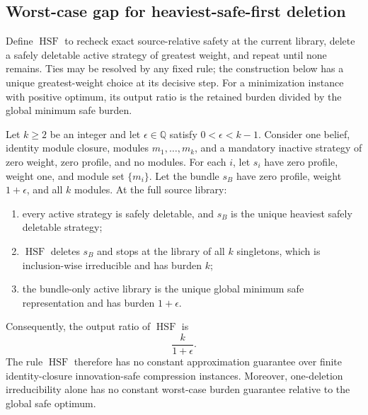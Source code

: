 \subsection{Worst-case gap for heaviest-safe-first deletion}
\label{sec:aor-safe-deletion-gap}

Define
\(\operatorname{HSF}\) to recheck exact source-relative safety at the current
library, delete a safely deletable active strategy of greatest weight, and
repeat until none remains.  Ties may be resolved by any fixed rule; the
construction below has a unique greatest-weight choice at its decisive step.
For a minimization instance with positive optimum, its output ratio is the
retained burden divided by the global minimum safe burden.

\begin{theorem}
\label{thm:aor-heaviest-safe-first-gap}
Let \(k\geq2\) be an integer and let
\(\epsilon\in\mathbb Q\) satisfy \(0<\epsilon<k-1\).  Consider one belief,
identity module closure, modules \(m_1,\ldots,m_k\), and a mandatory inactive
strategy of zero weight, zero profile, and no modules.  For each \(i\), let
\(s_i\) have zero profile, weight one, and module set \(\{m_i\}\).  Let the
bundle \(s_B\) have zero profile, weight \(1+\epsilon\), and all \(k\)
modules.  At the full source library:
\begin{enumerate}
\item every active strategy is safely deletable, and \(s_B\) is the unique
  heaviest safely deletable strategy;
\item \(\operatorname{HSF}\) deletes \(s_B\) and stops at the library of all
  \(k\) singletons, which is inclusion-wise irreducible and has burden \(k\);
\item the bundle-only active library is the unique global minimum safe
  representation and has burden \(1+\epsilon\).
\end{enumerate}
Consequently, the output ratio of \(\operatorname{HSF}\) is
\[
 \frac{k}{1+\epsilon}.
\]
The rule \(\operatorname{HSF}\) therefore has no constant approximation
guarantee over finite identity-closure innovation-safe compression instances.
Moreover, one-deletion irreducibility alone has no constant worst-case burden
guarantee relative to the global safe optimum.
\end{theorem}

